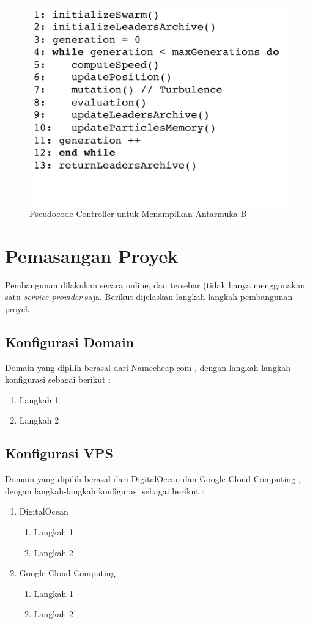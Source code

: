       \begin{figure}[H]
        \centering
        \includegraphics[width=\linewidth]{images/bab4/smpso_code.png}
        \caption{ Pseudocode Controller untuk Menampilkan Antarmuka B }
        \label{pdm}
      \end{figure}
    
    
\section{Pemasangan Proyek}
	Pembangunan dilakukan secara online, dan tersebar (tidak hanya menggunakan satu \textit{service provider} saja.
    Berikut dijelaskan langkah-langkah pembangunan proyek:
    
    \subsection{Konfigurasi Domain}
    Domain yang dipilih berasal dari Namecheap.com , dengan langkah-langkah konfigurasi sebagai berikut :
    \begin{enumerate}
    \item Langkah 1
    \item Langkah 2
    \end{enumerate}
    \subsection{Konfigurasi VPS}
    Domain yang dipilih berasal dari DigitalOcean dan Google Cloud Computing , dengan langkah-langkah konfigurasi sebagai berikut :
    \begin{enumerate}
    \item DigitalOcean
      \begin{enumerate}
      \item Langkah 1
      \item Langkah 2
      \end{enumerate}
    \item Google Cloud Computing
      \begin{enumerate}
      \item Langkah 1
      \item Langkah 2
      \end{enumerate}
    \end{enumerate}
    
